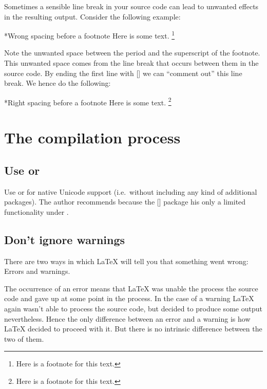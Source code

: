 Sometimes a sensible line break in your source code can lead to unwanted effects in the resulting output.
Consider the following example:
\begin{showlatex}*{Wrong spacing before a footnote}
Here is some text.
\footnote{Here is a footnote for this text.}
\end{showlatex}
Note the unwanted space between the period and the superscript of the footnote.
This unwanted space comes from the line break that occurs between them in the source code.
By ending the first line with \inlinecode{\%}\massindex{\%}[\inlinecode] we can \enquote{comment out} this line break.
We hence do the following:
\begin{showlatex}*{Right spacing before a footnote}
Here is some text.%
\footnote{Here is a footnote for this text.}
\end{showlatex}





\section{The compilation process}



\subsection{Use \texorpdfstring{\LuaLaTeX}{LuaLaTeX} or \texorpdfstring{\XeLaTeX}{XeLaTeX}}

Use {\LuaLaTeX} or {\XeLaTeX} for native Unicode support (i.e.\ without including any kind of additional packages).
The author recommends {\LuaLaTeX} because the [\packname] package his only a limited functionality under {\XeLaTeX}.



\subsection{Don’t ignore warnings}

There are two ways in which {\LaTeX} will tell you that something went wrong:
Errors and warnings.

The occurrence of an error means that {\LaTeX} was unable the process the source code and gave up at some point in the process.
In the case of a warning {\LaTeX} again wasn’t able to process the source code, but decided to produce some output nevertheless.
Hence the only difference between an error and a warning is how {\LaTeX} decided to proceed with it.
But there is no intrinsic difference between the two of them.

